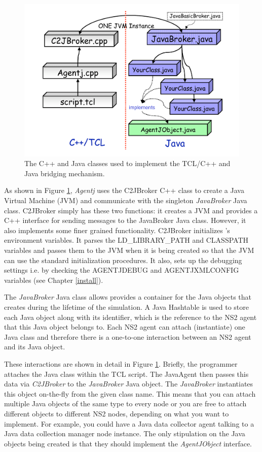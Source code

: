 \begin{figure}
\centering
\includegraphics[scale=0.4]{images/agentjClasses}
\caption{The C++ and Java classes used to implement the TCL/C++ and Java
bridging mechanism.} 
\label{agentj:fig:jniClasses}
\end{figure}

As shown in Figure \ref{agentj:fig:jniClasses}, \emph{Agentj} uses the
C2JBroker C++ class to create a Java Virtual Machine (JVM) and 
communicate with the singleton \emph{JavaBroker} Java class.  
C2JBroker simply has these two functions:  it creates a JVM and 
provides a C++ interface for sending messages to the JavaBroker 
Java class. However, it also implements some finer grained 
functionality. C2JBroker initializes \agentj's environment variables.
It parses the LD\_LIBRARY\_PATH and CLASSPATH variables and
passes them to the JVM when it is being created so that the JVM
can use the standard initialization procedures.  It also, sets
up the debugging settings i.e. by checking the AGENTJDEBUG
and AGENTJXMLCONFIG variables (see Chapter \ref{install}).  


The \emph{JavaBroker} Java class allows provides a container 
for the Java objects that \agentj creates during the lifetime of the 
simulation.  A Java Hashtable is used to store each Java object 
along with its identifier, which is the reference to the NS2
agent that this Java object belongs to.  Each NS2 agent can
attach (instantiate) one Java class and therefore there is a 
one-to-one interaction between an NS2 agent and its Java object. 

These interactions are shown in detail in Figure \ref{agentj:fig:jniClasses}. 
Briefly, the programmer attaches the Java class within
the TCL script.  The JavaAgent then passes this data via \emph{C2JBroker}
to the \emph{JavaBroker} Java object. The \emph{JavaBroker} instantiates 
this object on-the-fly from the given class name.  This means that you can
attach multiple Java objects of the same type to every node or you are free
to attach different objects to different NS2 nodes, depending on what you 
want to implement.  For example, you could have a Java data collector 
agent talking to a Java data collection manager node instance. The only 
stipulation on the Java objects being created is that they should implement 
the \emph{AgentJObject} interface.
 
